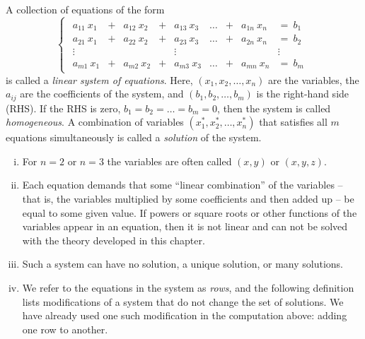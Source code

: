 \begin{definition} 
\label{def:lin_sys_equ}
A collection of equations of the form
\begin{equation*}
\begin{cases}
\begin{array}{ccccccccc}
a_{11} \: x_1 & + & a_{12} \: x_2 & + & a_{13} \: x_3 & \dots & + & a_{1n} \: x_n & = \: b_1 \\
a_{21} \: x_1 & + & a_{22} \: x_2 & + & a_{23} \: x_3 & \dots & + & a_{2n} \: x_n & = \: b_2 \\
\vdots & & & & \vdots & & & &\vdots \\
a_{m1} \: x_1 & + & a_{m2} \: x_2 & + & a_{m3} \: x_3 & \dots & + & a_{mn} \: x_n & = \: b_m 
\end{array} \end{cases}
\end{equation*}
is called a \emph{linear system of equations}. Here, $(x_1,x_2,\dots,x_n)$ are the variables, the $a_{ij}$ are the coefficients of the system, and $(b_1,b_2,\dots,b_m)$ is the right-hand side (RHS). If the RHS is zero, $b_1 = b_2 = \dots = b_m = 0$, then the system is called \emph{homogeneous}. A combination of variables $(x_1^*,x_2^*,\dots,x_n^*)$ that satisfies all $m$ equations simultaneously is called a \emph{solution} of the system.
\end{definition}

\begin{remark}
\begin{enumerate}[(i)]
\item For $n=2$ or $n=3$ the variables are often called $(x,y)$ or $(x,y,z)$.
\item Each equation demands that some ``linear combination'' of the variables -- that is, the variables multiplied by some coefficients and then added up -- be equal to some given value. If powers or square roots or other functions of the variables appear in an equation, then it is not linear and can not be solved with the theory developed in this chapter.
\item Such a system can have no solution, a unique solution, or many solutions.
\item We refer to the equations in the system as \emph{rows}, and the following definition lists modifications of a system that do not change the set of solutions. We have already used one such modification in the computation above: adding one row to another.
\end{enumerate}
\end{remark}

